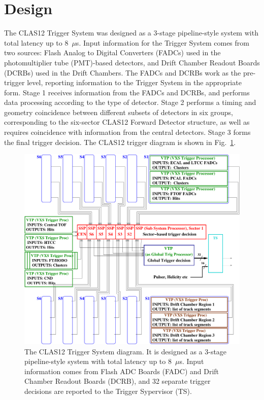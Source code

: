 \section{Design}

The CLAS12 Trigger System was designed as a 3-stage pipeline-style system with total latency up to 8~$\mu$s. Input information for the Trigger System comes from two sources:  Flash Analog to Digital Converters (FADCs) used in the photomultiplier tube (PMT)-based detectors, and Drift Chamber Readout Boards (DCRBs) used in the Drift Chambers. The FADCs and DCRBs work as the pre-trigger level, reporting information to the Trigger System in the appropriate form. Stage 1 receives information from the FADCs and DCRBs, and performs data processing according to the type of detector. Stage 2 performs a timing and geometry coincidence between different subsets of detectors in six groups, corresponding to the six-sector CLAS12 Forward Detector structure, as well as requires coincidence with information from the central detectors. Stage 3 forms the final trigger decision. The CLAS12 trigger diagram is shown in Fig.~\ref{fig:TriggerDiagram}.

\begin{figure}[hbt]
	\centering
	\includegraphics[width=1.0\columnwidth,keepaspectratio]{img/CLAS12_TRIGGER_1.pdf}
	\caption{The CLAS12 Trigger System diagram. It is designed as a 3-stage pipeline-style system with total latency up to 8~$\mu$s. Input information comes from Flash ADC Boards (FADC) and Drift Chamber Readout Boards (DCRB), and 32 separate trigger decisions are reported to the Trigger Sypervisor (TS). }
	\label{fig:TriggerDiagram}
\end{figure}


